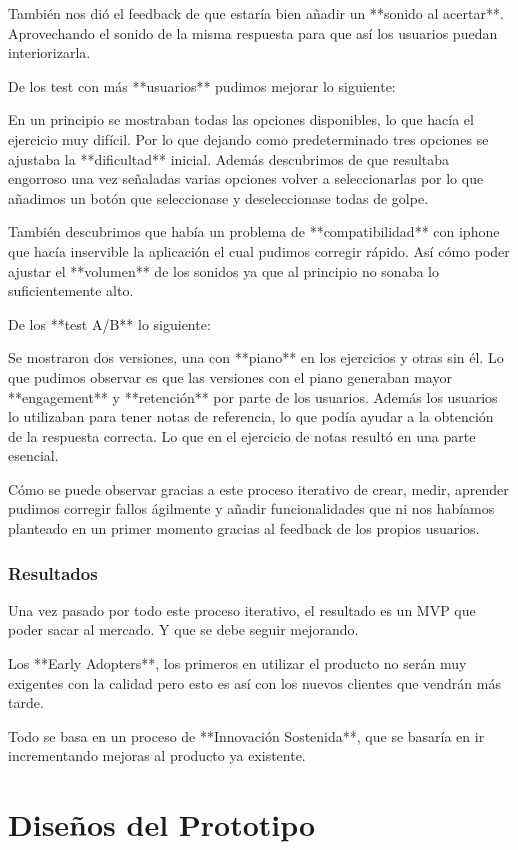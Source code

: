 \documentclass[12pt,twoside,titlepage]{report}
\begin{document}
También nos dió el feedback de que estaría bien añadir un **sonido al acertar**. Aprovechando el sonido de la misma respuesta para que así los usuarios puedan interiorizarla.

De los test con más **usuarios** pudimos mejorar lo siguiente:

En un principio se mostraban todas las opciones disponibles, lo que hacía el ejercicio muy difícil. Por lo que dejando como predeterminado tres opciones se ajustaba la **dificultad** inicial. Además descubrimos de que resultaba engorroso una vez señaladas varias opciones volver a seleccionarlas por lo que añadimos un botón que seleccionase y deseleccionase todas de golpe.

También descubrimos que había un problema de **compatibilidad** con iphone que hacía inservible la aplicación el cual pudimos corregir rápido. Así cómo poder ajustar el **volumen** de los sonidos ya que al principio no sonaba lo suficientemente alto.

De los **test A/B** lo siguiente:

Se mostraron dos versiones, una con **piano** en los ejercicios y otras sin él. Lo que pudimos observar es que las versiones con el piano generaban mayor **engagement** y **retención** por parte de los usuarios. Además los usuarios lo utilizaban para tener notas de referencia, lo que podía ayudar a la obtención de la respuesta correcta. Lo que en el ejercicio de notas resultó en una parte esencial.

Cómo se puede observar gracias a este proceso iterativo de crear, medir, aprender pudimos corregir fallos ágilmente y añadir funcionalidades que ni nos habíamos planteado en un primer momento gracias al feedback de los propios usuarios.

\subsection{Resultados}

Una vez pasado por todo este proceso iterativo, el resultado es un MVP que poder sacar al mercado. Y que se debe seguir mejorando. 

Los **Early Adopters**, los primeros en utilizar el producto no serán muy exigentes con la calidad pero esto es así con los nuevos clientes que vendrán más tarde. 

Todo se basa en un proceso de **Innovación Sostenida**, que se basaría en ir incrementando mejoras al producto ya existente.

\chapter{Diseños del Prototipo}
\end{document}
